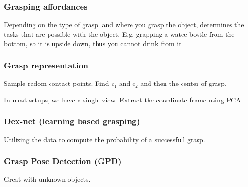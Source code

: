 \documentclass[a4paper]{article}
\begin{document}
\subsubsection{Grasping affordances}
Depending on the type of grasp, and where you grasp the object, determines the tasks that are possible with the object. E.g. grapping a watee bottle from the bottom, so it is upside down, thus you cannot drink from it. 

\subsubsection{Grasp representation}
Sample radom contact points. Find $ c_1 $ and $  c_2 $ and then the center of grasp. 

In most setups, we have a single view. Extract the coordinate frame using PCA. 

\subsubsection{Dex-net (learning based grasping)}
Utilizing the data to compute the probability of a successfull grasp. 

\subsubsection{Grasp Pose Detection (GPD)}
Great with unknown objects. 
\end{document}
